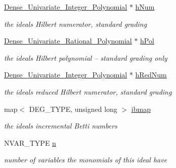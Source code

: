 \begin{DoxyCompactItemize}
\mbox{\label{group__polygroup_a2613e425082e968058426465d309abbc}} 
\hyperlink{group__polygroup_class_dense___univariate___integer___polynomial}{Dense\+\_\+\+Univariate\+\_\+\+Integer\+\_\+\+Polynomial} $\ast$ \hyperlink{group__polygroup_a2613e425082e968058426465d309abbc}{h\+Num}
\begin{DoxyCompactList}\small\item\em the ideal\textquotesingle{}s Hilbert numerator, standard grading \end{DoxyCompactList}\item 
\mbox{\label{group__polygroup_a90e5ee8eb2a8c5b3ebe63ee381f42535}} 
\hyperlink{group__polygroup_class_dense___univariate___rational___polynomial}{Dense\+\_\+\+Univariate\+\_\+\+Rational\+\_\+\+Polynomial} $\ast$ \hyperlink{group__polygroup_a90e5ee8eb2a8c5b3ebe63ee381f42535}{h\+Pol}
\begin{DoxyCompactList}\small\item\em the ideal\textquotesingle{}s Hilbert polynomial -- standard grading only \end{DoxyCompactList}\item 
\mbox{\label{group__polygroup_a4a060a173e9550bf986c9aa2697cbc27}} 
\hyperlink{group__polygroup_class_dense___univariate___integer___polynomial}{Dense\+\_\+\+Univariate\+\_\+\+Integer\+\_\+\+Polynomial} $\ast$ \hyperlink{group__polygroup_a4a060a173e9550bf986c9aa2697cbc27}{h\+Red\+Num}
\begin{DoxyCompactList}\small\item\em the ideal\textquotesingle{}s reduced Hilbert numerator, standard grading \end{DoxyCompactList}\item 
\mbox{\label{group__polygroup_a470f90818d3c1c49e1da7804e581324f}} 
map$<$ D\+E\+G\+\_\+\+T\+Y\+PE, unsigned long $>$ \hyperlink{group__polygroup_a470f90818d3c1c49e1da7804e581324f}{ibmap}
\begin{DoxyCompactList}\small\item\em the ideal\textquotesingle{}s incremental Betti numbers \end{DoxyCompactList}\item 
\mbox{\label{group__polygroup_a4340e27f56e4229b2357e00bd6c98021}} 
N\+V\+A\+R\+\_\+\+T\+Y\+PE \hyperlink{group__polygroup_a4340e27f56e4229b2357e00bd6c98021}{n}
\begin{DoxyCompactList}\small\item\em number of variables the monomials of this ideal have \end{DoxyCompactList}\end{DoxyCompactItemize}
